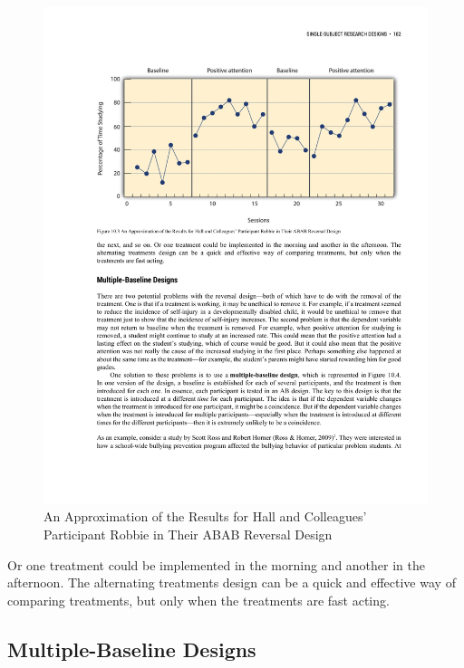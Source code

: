 \begin{figure}
\includegraphics[width=\linewidth]{figures/C10alternating.pdf}
\caption{An Approximation of the Results for Hall and Colleagues' Participant Robbie in Their ABAB Reversal Design}
\label{fig:alternating}
\end{figure}


Or one treatment could be implemented in the morning and another in the afternoon. The alternating treatments design can be a quick and effective way of comparing treatments, but only when the treatments are fast acting.

\subsection{Multiple-Baseline Designs}

